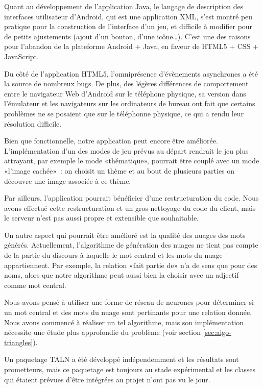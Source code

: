 \documentclass[a4paper,11pt,french]{article}
\def\android{Android\texttrademark{}}
\begin{document}
Quant au développement de l'application Java, le langage de description des interfaces utilisateur d'\android{}, qui est une application XML,
s'est montré peu pratique pour la construction de l'interface d'un jeu, et difficile à modifier pour de petits ajustements (ajout d'un
bouton, d'une icône…). C'est une des raisons pour l'abandon de la plateforme \android{} + Java, en faveur de HTML5 + CSS + JavaScript.

Du côté de l'application HTML5, l'omniprésence d'évènements asynchrones a été la source de nombreux bugs. De plus, des légères différences de
comportement entre le navigateur Web d'\android{} sur le téléphone physique, sa version dans l'émulateur et les navigateurs sur les ordinateurs de bureau ont fait que certains problèmes ne se posaient que
sur le téléphonne physique, ce qui a rendu leur résolution difficile.

Bien que fonctionnelle, notre application peut encore être améliorée. L'implémentation d'un des modes de jeu prévus au départ rendrait le jeu plus attrayant, par exemple
le mode «thématique», pourrait être couplé avec un mode «l'image cachée»~: on choisit un thème et au bout de plusieurs parties on découvre une
image associée à ce thème.

Par ailleurs, l'application pourrait bénéficier d'une restructuration du code. Nous avons effectué cette restructuration et un gros
nettoyage du code du client, mais le serveur n'est pas aussi propre et extensible que souhaitable.

Un autre aspect qui pourrait être amélioré est la qualité des nuages des mots générés. Actuellement, l'algorithme de génération des nuages ne tient pas
compte de la partie du discours à laquelle le mot central et les mots du nuage appartiennent. Par exemple, la relation «fait partie de» n'a
de sens que pour des noms, alors que notre algorithme peut aussi bien la choisir avec un adjectif comme mot central.

Nous avons pensé à utiliser une forme de réseau de neurones pour déterminer si un mot central et des mots du nuage sont pertinants pour une
relation donnée. Nous avons commencé à réaliser un tel algorithme, mais son implémentation nécessite une étude plus approfondie du problème (voir section \ref{sec:algo-triangles}). 

Un paquetage TALN a été développé indépendemment et les résultats sont prometteurs, mais ce paquetage est toujours au stade expérimental et les classes qui étaient prévues d'être intégrées au projet n'ont pas vu le jour.
\end{document}
